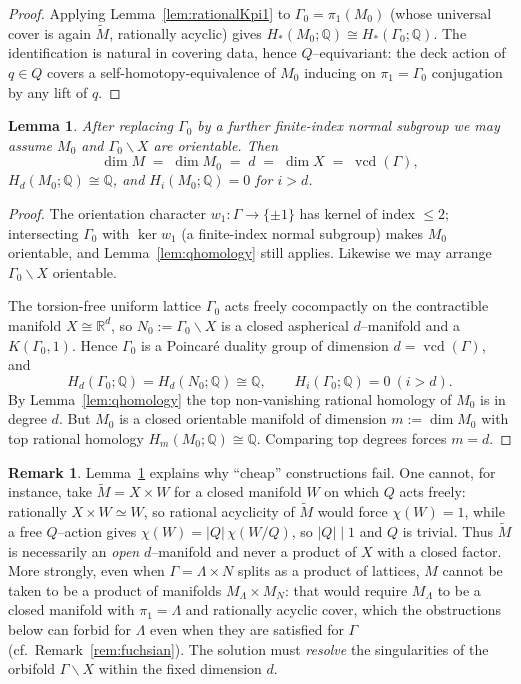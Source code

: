 \documentclass[12pt]{article}
\newcommand{\bR}{\mathbb{R}}
\newcommand{\bQ}{\mathbb{Q}}
\DeclareMathOperator{\vcd}{vcd}
\newtheorem{lemma}{Lemma}
\theoremstyle{definition}
\newtheorem{remark}{Remark}
\begin{document}
\begin{proof}
Applying Lemma~\ref{lem:rationalKpi1} to $\Gamma_0=\pi_1(M_0)$ (whose universal
cover is again $\widetilde M$, rationally acyclic) gives
$H_*(M_0;\bQ)\cong H_*(\Gamma_0;\bQ)$.  The identification is natural in covering
data, hence $Q$--equivariant: the deck action of $q\in Q$ covers a
self-homotopy-equivalence of $M_0$ inducing on $\pi_1=\Gamma_0$ conjugation by any
lift of $q$.
\end{proof}

\begin{lemma}\label{lem:dimension}
After replacing $\Gamma_0$ by a further finite-index normal subgroup we may assume
$M_0$ and $\Gamma_0\backslash X$ are orientable.  Then
\[
   \dim M \;=\; \dim M_0 \;=\; d \;=\; \dim X \;=\; \vcd(\Gamma),
\]
$H_d(M_0;\bQ)\cong\bQ$, and $H_i(M_0;\bQ)=0$ for $i>d$.
\end{lemma}

\begin{proof}
The orientation character $w_1\colon\Gamma\to\{\pm1\}$ has kernel of index
$\le2$; intersecting $\Gamma_0$ with $\ker w_1$ (a finite-index normal subgroup)
makes $M_0$ orientable, and Lemma~\ref{lem:qhomology} still applies.  Likewise we
may arrange $\Gamma_0\backslash X$ orientable.

The torsion-free uniform lattice $\Gamma_0$ acts freely cocompactly on the
contractible manifold $X\cong\bR^d$, so $N_0:=\Gamma_0\backslash X$ is a closed
aspherical $d$--manifold and a $K(\Gamma_0,1)$.  Hence $\Gamma_0$ is a
Poincar\'e duality group of dimension $d=\vcd(\Gamma)$, and
\[
   H_d(\Gamma_0;\bQ)=H_d(N_0;\bQ)\cong\bQ,\qquad H_i(\Gamma_0;\bQ)=0\ (i>d).
\]
By Lemma~\ref{lem:qhomology} the top non-vanishing rational homology of $M_0$ is
in degree $d$.  But $M_0$ is a closed orientable manifold of dimension
$m:=\dim M_0$ with top rational homology $H_m(M_0;\bQ)\cong\bQ$.  Comparing top
degrees forces $m=d$.
\end{proof}

\begin{remark}\label{rem:noproduct}
Lemma~\ref{lem:dimension} explains why ``cheap'' constructions fail.  One cannot,
for instance, take $\widetilde M=X\times W$ for a closed manifold $W$ on which $Q$
acts freely: rationally $X\times W\simeq W$, so rational acyclicity of
$\widetilde M$ would force $\chi(W)=1$, while a free $Q$--action gives
$\chi(W)=|Q|\,\chi(W/Q)$, so $|Q|\mid1$ and $Q$ is trivial.  Thus
$\widetilde M$ is necessarily an \emph{open} $d$--manifold and never a product of
$X$ with a closed factor.  More strongly, even when $\Gamma=\Lambda\times N$
splits as a product of lattices, $M$ cannot be taken to be a product of manifolds
$M_\Lambda\times M_N$: that would require $M_\Lambda$ to be a closed manifold with
$\pi_1=\Lambda$ and rationally acyclic cover, which the obstructions below can
forbid for $\Lambda$ even when they are satisfied for $\Gamma$
(cf.\ Remark~\ref{rem:fuchsian}).  The solution must \emph{resolve} the
singularities of the orbifold $\Gamma\backslash X$ within the fixed dimension $d$.
\end{remark}
\end{document}
